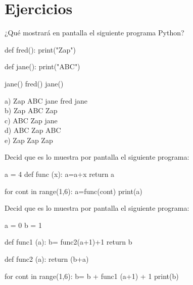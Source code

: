 \section*{Ejercicios}\label{ejercicios}

\begin{ejercicio}
¿Qué mostrará en pantalla el siguiente programa
Python?

\begin{python}
def fred():
   print("Zap")

def jane():
   print("ABC")

jane()
fred()
jane()
\end{python}

a) Zap ABC jane fred jane\\
b) Zap ABC Zap\\
c) ABC Zap jane\\
d) ABC Zap ABC\\
e) Zap Zap Zap
\end{ejercicio}

\begin{ejercicio}Decid que es lo muestra por pantalla el siguiente programa:
\begin{python}
a = 4
def func (x):
    a=a+x
    return a

for cont in range(1,6):
    a=func(cont)
    print(a)
\end{python}

\end{ejercicio}

\begin{ejercicio}
Decid que es lo muestra por pantalla el siguiente programa:
\begin{python}
a = 0
b = 1

def func1 (a):
    b= func2(a+1)+1
	return b

def func2 (a):
	return (b+a)

for cont in range(1,6):
	b= b + func1 (a+1) + 1
    print(b)
\end{python}
\end{ejercicio}

